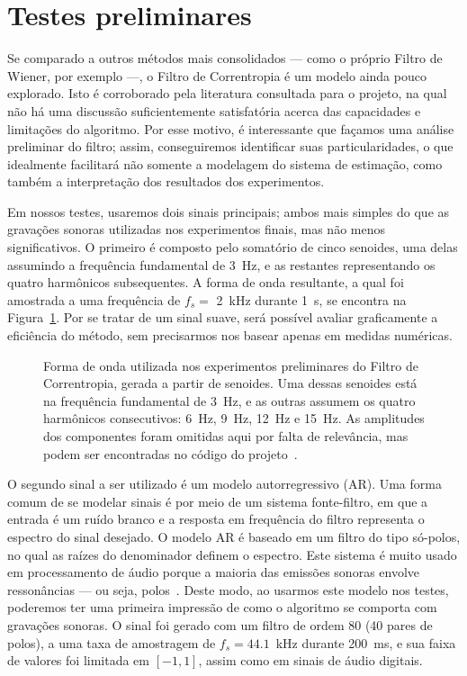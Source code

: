 \section{Testes preliminares}

Se comparado a outros métodos mais consolidados --- como o próprio Filtro de Wiener,
por exemplo ---, o Filtro de Correntropia é um modelo ainda pouco explorado. Isto é
corroborado pela literatura consultada para o projeto, na qual não há uma discussão
suficientemente satisfatória acerca das capacidades e limitações do algoritmo. Por esse
motivo, é interessante que façamos uma análise preliminar do filtro; assim,
conseguiremos identificar suas particularidades, o que idealmente facilitará não
somente a modelagem do sistema de estimação, como também a interpretação dos resultados
dos experimentos.

Em nossos testes, usaremos dois sinais principais; ambos mais simples do que as
gravações sonoras utilizadas nos experimentos finais, mas não menos significativos. O
primeiro é composto pelo somatório de cinco senoides, uma delas assumindo a frequência
fundamental de 3~Hz, e as restantes representando os quatro harmônicos subsequentes. A
forma de onda resultante, a qual foi amostrada a uma frequência de $f_s =$ 2~kHz
durante 1~s, se encontra na Figura~\ref{fig:correntropy:sinewave}. Por se tratar de um
sinal suave, será possível avaliar graficamente a eficiência do método, sem precisarmos
nos basear apenas em medidas numéricas.

\begin{figure}[!ht]
	\centering
	
	\caption[Forma de onda gerada a partir de senoides utilizada nos experimentos preliminares do Filtro de Correntropia]{Forma de onda utilizada nos experimentos preliminares do Filtro de Correntropia, gerada a partir de senoides. Uma dessas senoides está na frequência fundamental de 3~Hz, e as outras assumem os quatro harmônicos consecutivos: 6~Hz, 9~Hz, 12~Hz e 15~Hz. As amplitudes dos componentes foram omitidas aqui por falta de relevância, mas podem ser encontradas no código do projeto~\cite{nonlinear-filters-repo}.}
	\label{fig:correntropy:sinewave}
\end{figure}

O segundo sinal a ser utilizado é um modelo autorregressivo
(AR). Uma forma comum de se modelar sinais é por meio de um
sistema fonte-filtro, em que a entrada é um ruído branco e a resposta em frequência do
filtro representa o espectro do sinal desejado. O modelo AR é baseado em um filtro do
tipo só-polos, no qual as raízes do denominador definem o espectro. Este sistema é
muito usado em processamento de áudio porque a maioria das emissões sonoras envolve
ressonâncias --- ou seja, polos~\cite{godsill-2002}. Deste modo, ao usarmos este modelo
nos testes, poderemos ter uma primeira impressão de como o algoritmo se comporta com
gravações sonoras. O sinal foi gerado com um filtro de ordem 80 (40 pares de polos), a
uma taxa de amostragem de $f_s = 44.1$~kHz durante 200~ms, e sua faixa de valores foi
limitada em $[-1, 1]$, assim como em sinais de áudio digitais.


